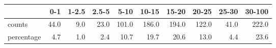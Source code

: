 \begin{table}[ht]
\centering
\begin{tabular}{lrrrrrrrrr}
  \hline
 & 0-1 & 1-2.5 & 2.5-5 & 5-10 & 10-15 & 15-20 & 20-25 & 25-30 & 30-100 \\ 
  \hline
counts & 44.0 & 9.0 & 23.0 & 101.0 & 186.0 & 194.0 & 122.0 & 41.0 & 222.0 \\ 
  percentage & 4.7 & 1.0 & 2.4 & 10.7 & 19.7 & 20.6 & 13.0 & 4.4 & 23.6 \\ 
   \hline
\end{tabular}
\end{table}
